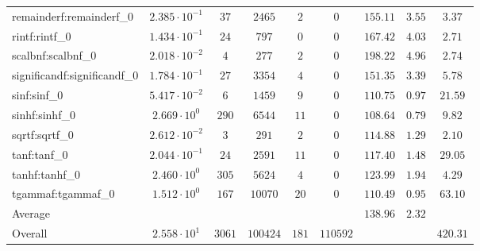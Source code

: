 \begin{tabular}{|l|c|c|c|c|c|c|c|c|}
remainderf:remainderf\_0     & $ 2.385 \cdot 10^{-1} $ & $ 37     $ & $ 2465   $ & $ 2   $ & $ 0      $ & $ 155.11      $ & $ 3.55    $ & $ 3.37    $ \\
rintf:rintf\_0               & $ 1.434 \cdot 10^{-1} $ & $ 24     $ & $ 797    $ & $ 0   $ & $ 0      $ & $ 167.42      $ & $ 4.03    $ & $ 2.71    $ \\
scalbnf:scalbnf\_0           & $ 2.018 \cdot 10^{-2} $ & $ 4      $ & $ 277    $ & $ 2   $ & $ 0      $ & $ 198.22      $ & $ 4.96    $ & $ 2.74    $ \\
significandf:significandf\_0 & $ 1.784 \cdot 10^{-1} $ & $ 27     $ & $ 3354   $ & $ 4   $ & $ 0      $ & $ 151.35      $ & $ 3.39    $ & $ 5.78    $ \\
sinf:sinf\_0                 & $ 5.417 \cdot 10^{-2} $ & $ 6      $ & $ 1459   $ & $ 9   $ & $ 0      $ & $ 110.75      $ & $ 0.97    $ & $ 21.59   $ \\
sinhf:sinhf\_0               & $ 2.669 \cdot 10^{0}  $ & $ 290    $ & $ 6544   $ & $ 11  $ & $ 0      $ & $ 108.64      $ & $ 0.79    $ & $ 9.82    $ \\
sqrtf:sqrtf\_0               & $ 2.612 \cdot 10^{-2} $ & $ 3      $ & $ 291    $ & $ 2   $ & $ 0      $ & $ 114.88      $ & $ 1.29    $ & $ 2.10    $ \\
tanf:tanf\_0                 & $ 2.044 \cdot 10^{-1} $ & $ 24     $ & $ 2591   $ & $ 11  $ & $ 0      $ & $ 117.40      $ & $ 1.48    $ & $ 29.05   $ \\
tanhf:tanhf\_0               & $ 2.460 \cdot 10^{0}  $ & $ 305    $ & $ 5624   $ & $ 4   $ & $ 0      $ & $ 123.99      $ & $ 1.94    $ & $ 4.29    $ \\
tgammaf:tgammaf\_0           & $ 1.512 \cdot 10^{0}  $ & $ 167    $ & $ 10070  $ & $ 20  $ & $ 0      $ & $ 110.49      $ & $ 0.95    $ & $ 63.10   $ \\
\hline
Average                      & $                     $ & $        $ & $        $ & $     $ & $        $ & $ 138.96      $ & $ 2.32    $ & $         $ \\
\hline
Overall                      & $ 2.558 \cdot 10^{1}  $ & $ 3061   $ & $ 100424 $ & $ 181 $ & $ 110592 $ & $             $ & $         $ & $ 420.31  $ \\
\hline
\end{tabular}
